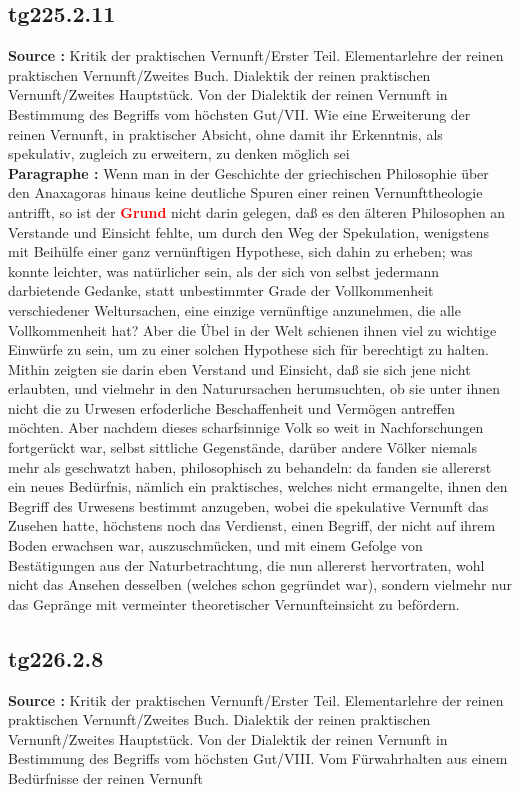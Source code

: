 \documentclass[a4paper,12pt,twoside]{book}
\newcommand{\match}[1]{\textcolor{red}{\textbf{#1}}}
\begin{document}
	\subsection*{tg225.2.11} 
	\textbf{Source : }Kritik der praktischen Vernunft/Erster Teil. Elementarlehre der reinen praktischen Vernunft/Zweites Buch. Dialektik der reinen praktischen Vernunft/Zweites Hauptstück. Von der Dialektik der reinen Vernunft in Bestimmung des Begriffs vom höchsten Gut/VII. Wie eine Erweiterung der reinen Vernunft, in praktischer Absicht, ohne damit ihr Erkenntnis, als spekulativ, zugleich zu erweitern, zu denken möglich sei\\  
	
	\noindent\textbf{Paragraphe : }Wenn man in der Geschichte der griechischen Philosophie über den Anaxagoras hinaus keine deutliche Spuren einer reinen Vernunfttheologie antrifft, so ist der \match{Grund} nicht darin gelegen, daß es den älteren Philosophen an Verstande und Einsicht fehlte, um durch den Weg der Spekulation, wenigstens mit Beihülfe einer ganz vernünftigen Hypothese, sich dahin zu erheben; was konnte leichter, was natürlicher sein, als der sich von selbst jedermann darbietende Gedanke, statt unbestimmter Grade der Vollkommenheit verschiedener Weltursachen, eine einzige vernünftige anzunehmen, die alle Vollkommenheit hat? Aber die Übel in der Welt schienen ihnen viel zu wichtige Einwürfe zu sein, um zu einer solchen Hypothese sich für berechtigt zu halten. Mithin zeigten sie darin eben Verstand und Einsicht, daß sie sich jene nicht erlaubten, und vielmehr in den Naturursachen herumsuchten, ob sie unter ihnen nicht die zu Urwesen erfoderliche Beschaffenheit und Vermögen antreffen möchten. Aber nachdem dieses scharfsinnige Volk so weit in Nachforschungen fortgerückt war, selbst sittliche Gegenstände, darüber andere Völker niemals mehr als geschwatzt haben, philosophisch zu behandeln: da fanden sie allererst ein neues Bedürfnis, nämlich ein praktisches, welches nicht ermangelte, ihnen den Begriff des Urwesens bestimmt anzugeben, wobei die spekulative Vernunft das Zusehen hatte, höchstens noch das Verdienst, einen Begriff, der nicht auf ihrem Boden erwachsen war, auszuschmücken, und mit einem Gefolge von Bestätigungen aus der Naturbetrachtung, die nun allererst hervortraten, wohl nicht das Ansehen desselben (welches schon gegründet war), sondern vielmehr nur das Gepränge mit vermeinter theoretischer Vernunfteinsicht zu befördern. 
	
	\subsection*{tg226.2.8} 
	\textbf{Source : }Kritik der praktischen Vernunft/Erster Teil. Elementarlehre der reinen praktischen Vernunft/Zweites Buch. Dialektik der reinen praktischen Vernunft/Zweites Hauptstück. Von der Dialektik der reinen Vernunft in Bestimmung des Begriffs vom höchsten Gut/VIII. Vom Fürwahrhalten aus einem Bedürfnisse der reinen Vernunft\\  
	
\end{document}
